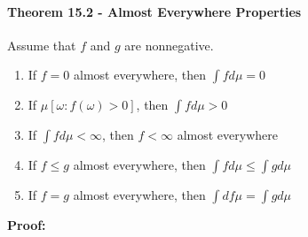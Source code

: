 \documentclass[12pt,a4paper]{article}
\newcommand{\1}[1]{\mathbbm{1}\left\{ #1 \right\}}
\begin{document}
\paragraph{Theorem 15.2 - Almost Everywhere Properties} Assume that $f$ and $g$ are nonnegative.
\begin{enumerate}
	\item If $f = 0$ almost everywhere, then $\int f d\mu = 0$
	\item If $\mu\left[\omega : f(\omega) > 0\right]$, then $\int f d\mu > 0$
	\item If $\int f d\mu < \infty$, then $f < \infty$ almost everywhere
	\item If $f \leq g$ almost everywhere, then $\int f d\mu \leq \int g d\mu$
	\item If $f = g$ almost everywhere, then $\int d f\mu = \int g d\mu$
\end{enumerate}
\textbf{Proof:}
\end{document}
